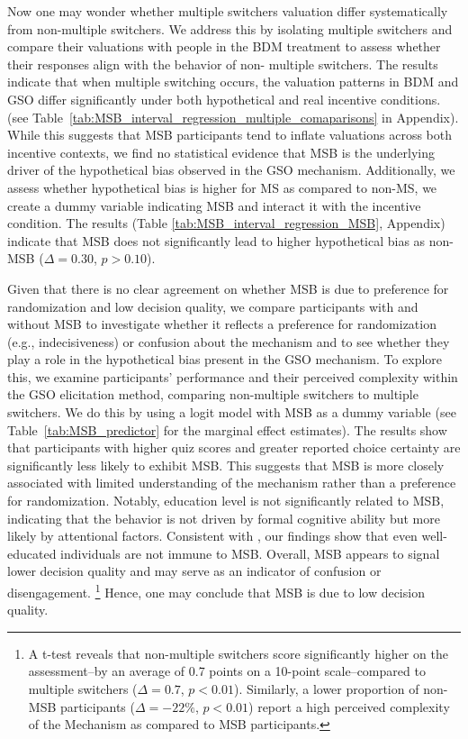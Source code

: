 \documentclass[12pt]{article}
\begin{document}
Now one may wonder whether multiple switchers valuation differ systematically from non-multiple switchers. 
We address this by isolating multiple switchers and compare their valuations with people in the BDM treatment to assess whether their responses align with the behavior of non- multiple switchers. The results indicate that when multiple switching occurs, the valuation patterns in BDM and GSO differ significantly under both hypothetical and real incentive conditions. (see Table~\ref{tab:MSB_interval_regression_multiple_comaparisons} in Appendix). While this suggests that MSB participants tend to inflate valuations across both incentive contexts, we find no statistical evidence that MSB is the underlying driver of the hypothetical bias observed in the GSO mechanism.  Additionally, we assess whether hypothetical bias is higher for MS as compared to non-MS, we create a dummy variable indicating MSB and interact it with the incentive condition. The results (Table \ref{tab:MSB_interval_regression_MSB}, Appendix) indicate that MSB does not significantly lead to higher hypothetical bias as non-MSB (\(\Delta = 0.30\), \(p > 0.10\)). 


Given that there is no clear agreement on whether MSB is due to preference for randomization and low decision quality, we compare participants with and without MSB to investigate whether it reflects a preference for randomization (e.g., indecisiveness) or confusion about the mechanism and to see whether they play a role in the hypothetical bias present in the GSO mechanism. To explore this, we examine participants' performance and their perceived complexity within the GSO elicitation method, comparing non-multiple switchers to multiple switchers. We do this by using a logit model with MSB as a dummy variable (see Table~\ref{tab:MSB_predictor} for the marginal effect estimates). The results show that participants with higher quiz scores and greater reported choice certainty are significantly less likely to exhibit MSB. This suggests that MSB is more closely associated with limited understanding of the mechanism rather than  a preference for randomization. Notably, education level is not significantly related to MSB, indicating that the behavior is not driven by formal cognitive ability but more likely by attentional factors. Consistent with \citet{yu2021multiple}, our findings show that even well-educated individuals are not immune to MSB. Overall, MSB appears to signal lower decision quality and may serve as an indicator of confusion or disengagement.
\footnote{A t-test reveals that non-multiple switchers score significantly higher on the assessment--by an average of 0.7 points on a 10-point scale--compared to multiple switchers (\(\Delta = 0.7\), \(p < 0.01\)). Similarly, a lower proportion of non-MSB participants (\(\Delta = -22\%\), \(p < 0.01\)) report a high perceived complexity of the Mechanism as compared to MSB participants.} Hence, one may conclude that MSB is due to low decision quality.
\end{document}
